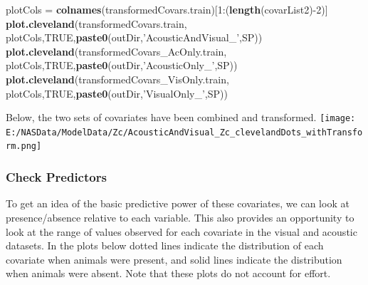 \documentclass[11pt,]{article}
\newenvironment{Shaded}{\begin{snugshade}}{\end{snugshade}}
\newcommand{\KeywordTok}[1]{\textcolor[rgb]{0.13,0.29,0.53}{\textbf{{#1}}}}
\newcommand{\DecValTok}[1]{\textcolor[rgb]{0.00,0.00,0.81}{{#1}}}
\newcommand{\StringTok}[1]{\textcolor[rgb]{0.31,0.60,0.02}{{#1}}}
\newcommand{\OtherTok}[1]{\textcolor[rgb]{0.56,0.35,0.01}{{#1}}}
\newcommand{\NormalTok}[1]{{#1}}
\begin{document}
\begin{Shaded}
\begin{Highlighting}[]
\NormalTok{plotCols =}\StringTok{ }\KeywordTok{colnames}\NormalTok{(transformedCovars.train)[}\DecValTok{1}\NormalTok{:(}\KeywordTok{length}\NormalTok{(covarList2)-}\DecValTok{2}\NormalTok{)]}
\KeywordTok{plot.cleveland}\NormalTok{(transformedCovars.train,}
               \NormalTok{plotCols,}\OtherTok{TRUE}\NormalTok{,}\KeywordTok{paste0}\NormalTok{(outDir,}\StringTok{'AcousticAndVisual_'}\NormalTok{,SP))}
\KeywordTok{plot.cleveland}\NormalTok{(transformedCovars_AcOnly.train,}
               \NormalTok{plotCols,}\OtherTok{TRUE}\NormalTok{,}\KeywordTok{paste0}\NormalTok{(outDir,}\StringTok{'AcousticOnly_'}\NormalTok{,SP))}
\KeywordTok{plot.cleveland}\NormalTok{(transformedCovars_VisOnly.train,}
               \NormalTok{plotCols,}\OtherTok{TRUE}\NormalTok{,}\KeywordTok{paste0}\NormalTok{(outDir,}\StringTok{'VisualOnly_'}\NormalTok{,SP))}
\end{Highlighting}
\end{Shaded}

Below, the two sets of covariates have been combined and transformed.
\texttt{[image: E:/NASData/ModelData/Zc/AcousticAndVisual\_Zc\_clevelandDots\_withTransform.png]}

\subsubsection{Check Predictors}\label{check-predictors}

To get an idea of the basic predictive power of these covariates, we can
look at presence/absence relative to each variable. This also provides
an opportunity to look at the range of values observed for each
covariate in the visual and acoustic datasets. In the plots below dotted
lines indicate the distribution of each covariate when animals were
present, and solid lines indicate the distribution when animals were
absent. Note that these plots do not account for effort.
\end{document}
